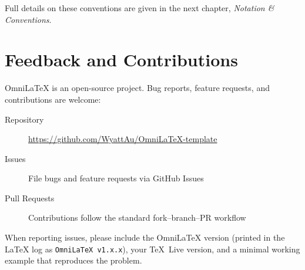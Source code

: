 Full details on these conventions are given in the next chapter,
\emph{Notation \& Conventions}.

\section{Feedback and Contributions}

OmniLaTeX is an open-source project.  Bug reports, feature requests, and
contributions are welcome:

\begin{description}
    \item[Repository] \url{https://github.com/WyattAu/OmniLaTeX-template}
    \item[Issues] File bugs and feature requests via GitHub Issues
    \item[Pull Requests] Contributions follow the standard fork--branch--PR
        workflow
\end{description}

When reporting issues, please include the OmniLaTeX version (printed in the
\LaTeX{} log as \texttt{OmniLaTeX v1.x.x}), your TeX~Live version, and a
minimal working example that reproduces the problem.
